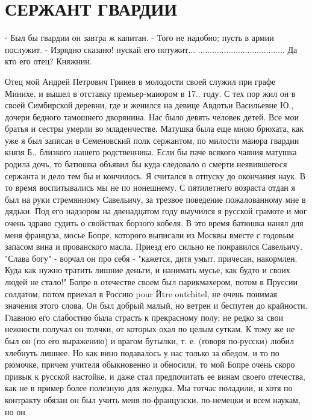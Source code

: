 \chapter{СЕРЖАНТ ГВАРДИИ}

     - Был бы гвардии он завтра ж капитан.
- Того не надобно; пусть в армии послужит.
- Изрядно сказано! пускай его потужит...
.....................................
Да кто его отец?
Княжнин.


Отец мой  Андрей  Петрович  Гринев в  молодости своей служил  при графе
Минихе,  и вышел в отставку  премьер-маиором в 17.. году. С тех пор жил он в
своей  Симбирской  деревни, где и  женился на девице  Авдотьи Васильевне Ю.,
дочери бедного тамошнего дворянина. Нас  было  девять человек детей. Все мои
братья и сестры умерли во младенчестве.
Матушка была еще мною брюхата, как уже я был записан в Семеновский полк
сержантом, по милости маиора гвардии князя Б., близкого нашего родственника.
Если бы паче всякого чаяния  матушка родила дочь, то батюшка объявил бы куда
следовало  о  смерти  неявившегося сержанта  и  дело тем  бы и кончилось.  Я
считался в  отпуску  до окончания наук. В  то время воспитывались  мы не  по
нонешнему. С пятилетнего возраста отдан я был на руки стремянному Савельичу,
за трезвое  поведение  пожалованному  мне  в  дядьки.  Под его  надзором  на
двенадцатом году выучился я русской  грамоте  и  мог  очень здраво судить  о
свойствах борзого кобеля. В это время батюшка нанял для меня француза, мосье
Бопре,  которого  выписали  из  Москвы  вместе  с  годовым  запасом  вина  и
прованского масла. Приезд его сильно не понравился Савельичу. "Слава богу" -
ворчал он про  себя  -  "кажется, дитя умыт,  причесан,  накормлен. Куда как
нужно тратить лишние деньги,  и нанимать  мусье, как будто и  своих людей не
стало!"
Бопре в отечестве  своем  был парикмахером,  потом  в Пруссии солдатом,
потом приехал в Россию  pour Йtre outchitel, не очень понимая значения этого
слова. Он был добрый малый, но ветрен и беспутен до  крайности. Главною  его
слабостию была страсть к прекрасному полу; не редко за свои нежности получал
он толчки,  от которых охал  по целым суткам. К  тому же не был он  (по  его
выражению) и врагом бутылки, т. е. (говоря по-русски) любил хлебнуть лишнее.
Но  как  вино  подавалось у нас только за  обедом,  и то  по рюмочке, причем
учителя  обыкновенно и  обносили, то мой  Бопре очень скоро привык к русской
настойке, и  даже  стал предпочитать ее  винам своего  отечества,  как  не в
пример  более полезную для желудка.  Мы тотчас поладили, и хотя по контракту
обязан он был  учить  меня  по-французски, по-немецки и  всем наукам,  но он
